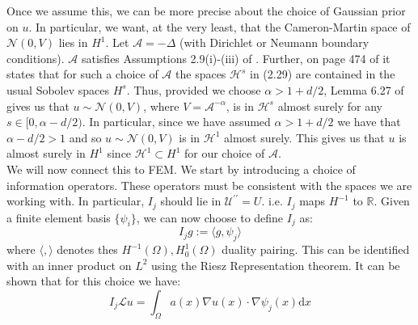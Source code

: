 \documentclass{article}
\theoremstyle{definition}
\theoremstyle{remark}
\begin{document}
Once we assume this, we can be more precise about the choice of Gaussian prior on $u$. In particular, we want, at the very least, that the Cameron-Martin space of $\mathcal{N}(0,V)$ lies in $H^1$. Let $\mathcal{A}=-\Delta$ (with Dirichlet or Neumann boundary conditions). $\mathcal{A}$ satisfies Assumptions 2.9(i)-(iii) of \cite{stuart2010inverse}. Further, on page 474 of \cite{stuart2010inverse} it states that for such a choice of $\mathcal{A}$ the spaces $\mathcal{H}^{s}$ in (2.29) are contained in the usual Sobolev spaces $H^s$. Thus, provided we choose $\alpha>1+d/2$, Lemma 6.27 of \cite{stuart2010inverse} gives us that
$u\sim\mathcal{N}(0,V)$, where $V=\mathcal{A}^{-\alpha}$, is in $\mathcal{H}^{s}$ almost surely for any $s\in[0,\alpha-d/2)$. In particular, since we have assumed $\alpha>1+d/2$ we have that $\alpha-d/2>1$ and so $u\sim\mathcal{N}(0,V)$ is in $\mathcal{H}^{1}$ almost surely. This gives us that $u$ is almost surely in $H^1$ since $\mathcal{H}^1\subset H^1$ for our choice of $\mathcal{A}$. \\

We will now connect this to FEM. We start by introducing a choice of information operators. These operators must be consistent with the spaces we are working with. In particular, $I_j$ should lie in $\mathcal{U}^{\prime\prime}=U$. i.e. $I_j$ maps $H^{-1}$ to $\mathbb{R}$. Given a finite element basis $\{\psi_{i}\}$, we can now choose to define $I_j$ as:
\begin{equation}
    \label{info_operator_def}
    I_{j}g := \langle g, \psi_j \rangle
\end{equation}
where $\langle , \rangle$ denotes thes $H^{-1}(\Omega),H_{0}^{1}(\Omega)$ duality pairing. This can be identified with an inner product on $L^{2}$ using the Riesz Representation theorem. It can be shown that for this choice we have:
\begin{equation}
    \label{info_operator_def_on_Lu}
    I_{j}\mathcal{L}u=\int_{\Omega}a(x)\nabla u(x)\cdot\nabla\psi_{j}(x)\mathrm{d}x
\end{equation}
\end{document}
